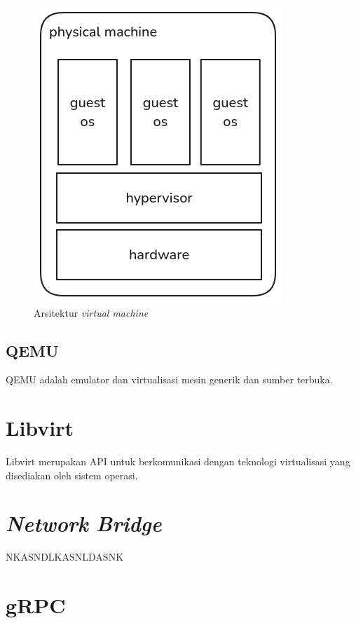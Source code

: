 \begin{figure}[H]
  \centering

  \includegraphics[scale=0.5]{gambar/virtual-machine-architecture.png}

  \caption{Arsitektur \emph{virtual machine}}
  \label{fig:arsitektur-virtual-machine}
\end{figure}

\subsection{QEMU}

QEMU adalah emulator dan virtualisasi mesin generik dan sumber terbuka.

\section{Libvirt}
\label{sec:libvirt}

Libvirt merupakan API untuk berkomunikasi dengan teknologi virtualisasi yang disediakan
oleh sistem operasi.

\section{\emph{Network Bridge}}
\label{sec:network-bridge}

NKASNDLKASNLDASNK

\section{gRPC}

